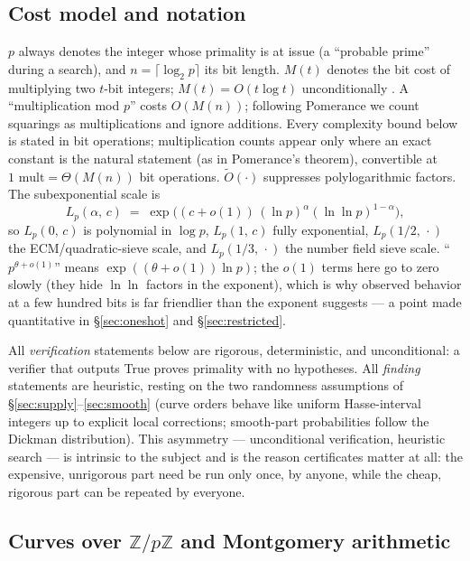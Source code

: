 \documentclass[11pt]{amsart}
\newcommand{\Z}{\mathbb{Z}}
\newcommand{\Ot}{\widetilde{O}}
\newcommand{\Lp}[2]{L_{p}\!\left(#1,\,#2\right)}
\theoremstyle{plain}
\theoremstyle{definition}
\theoremstyle{remark}
\begin{document}
\subsection{Cost model and notation}\label{sec:cost}

$p$ always denotes the integer whose primality is at issue (a ``probable prime'' during a search), and
$n = \lceil\log_2 p\rceil$ its bit length.  $M(t)$ denotes the bit cost of multiplying two $t$-bit
integers; $M(t) = O(t\log t)$ unconditionally \cite{HvdH21}.  A ``multiplication mod $p$'' costs
$O(M(n))$; following Pomerance we count squarings as multiplications and ignore additions.  Every
complexity bound below is stated in bit operations; multiplication counts appear only where an exact
constant is the natural statement (as in Pomerance's theorem), convertible at
$1 \text{ mult} = \Theta(M(n))$ bit operations.  $\Ot(\cdot)$ suppresses polylogarithmic factors.
The subexponential scale is
\[
  \Lp{\alpha}{c} \;=\; \exp\bigl( (c+o(1))\, (\ln p)^{\alpha} (\ln\ln p)^{1-\alpha} \bigr),
\]
so $\Lp{0}{c}$ is polynomial in $\log p$, $\Lp{1}{c}$ fully exponential, $\Lp{1/2}{\cdot}$ the
ECM/quadratic-sieve scale, and $\Lp{1/3}{\cdot}$ the number field sieve scale.  ``$p^{\theta+o(1)}$''
means $\exp((\theta+o(1))\ln p)$; the $o(1)$ terms here go to zero slowly (they hide $\ln\ln$ factors in
the exponent), which is why observed behavior at a few hundred bits is far friendlier than the exponent
suggests --- a point made quantitative in \S\ref{sec:oneshot} and \S\ref{sec:restricted}.

All \emph{verification} statements below are rigorous, deterministic, and unconditional: a verifier that
outputs True proves primality with no hypotheses.  All \emph{finding} statements are heuristic, resting
on the two randomness assumptions of \S\ref{sec:supply}--\ref{sec:smooth} (curve orders behave like
uniform Hasse-interval integers up to explicit local corrections; smooth-part probabilities follow the
Dickman distribution).  This asymmetry --- unconditional verification, heuristic search --- is intrinsic
to the subject and is the reason certificates matter at all: the expensive, unrigorous part need be run
only once, by anyone, while the cheap, rigorous part can be repeated by everyone.

\subsection{Curves over \texorpdfstring{$\Z/p\Z$}{Z/pZ} and Montgomery arithmetic}\label{sec:mont}
\end{document}
